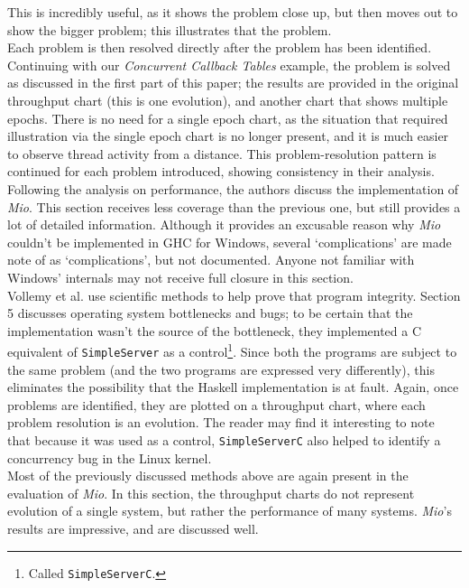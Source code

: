 \documentclass[9pt]{report}
\begin{document}
This is incredibly useful, as it shows the problem close up, but then moves out to show the bigger problem; this illustrates that the problem.\\

Each problem is then resolved directly after the problem has been identified.
Continuing with our {\it Concurrent Callback Tables} example, the problem is solved as discussed in the first part of this paper; the results are provided in the original throughput chart (this is one evolution), and another chart that shows multiple epochs.
There is no need for a single epoch chart, as the situation that required illustration via the single epoch chart is no longer present, and it is much easier to observe thread activity from a distance.
This problem-resolution pattern is continued for each problem introduced, showing consistency in their analysis.\\

\noindent
Following the analysis on performance, the authors discuss the implementation of {\it Mio}.
This section receives less coverage than the previous one, but still provides a lot of detailed information.
Although it provides an excusable reason why {\it Mio} couldn't be implemented in GHC for Windows, several `complications' are made note of as `complications', but not documented.
Anyone not familiar with Windows' internals may not receive full closure in this section.\\

\noindent
Vollemy et al. use scientific methods to help prove that program integrity.
Section 5 discusses operating system bottlenecks and bugs; to be certain that the implementation wasn't the source of the bottleneck, they implemented a C equivalent of \verb/SimpleServer/ as a control\footnote{Called \texttt{SimpleServerC}.}.
Since both the programs are subject to the same problem (and the two programs are expressed very differently), this eliminates the possibility that the Haskell implementation is at fault.
Again, once problems are identified, they are plotted on a throughput chart, where each problem resolution is an evolution.
The reader may find it interesting to note that because it was used as a control, \verb/SimpleServerC/ also helped to identify a concurrency bug in the Linux kernel.\\

\noindent
Most of the previously discussed methods above are again present in the evaluation of {\it Mio}.
In this section, the throughput charts do not represent evolution of a single system, but rather the performance of many systems.
{\it Mio}'s results are impressive, and are discussed well.
\end{document}
